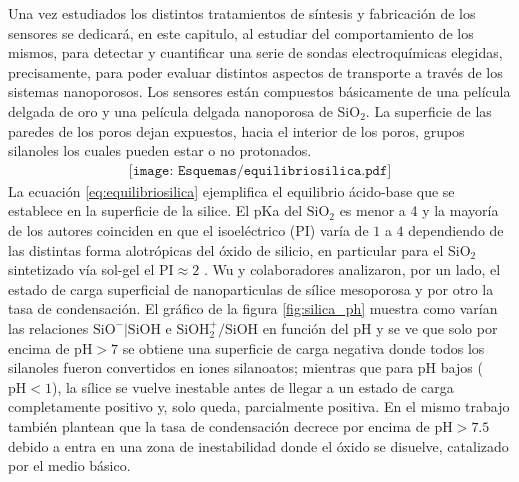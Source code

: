 	Una vez estudiados los distintos tratamientos de síntesis y fabricación de los sensores se dedicará, en este capitulo, al estudiar del comportamiento de los mismos, para detectar y cuantificar una serie de sondas electroquímicas elegidas, precisamente, para poder evaluar distintos aspectos de transporte a través de los sistemas nanoporosos. 
	Los sensores están compuestos básicamente de una película delgada de oro y una película delgada nanoporosa de SiO$_2$. La superficie de las paredes de los poros dejan expuestos, hacia el interior de los poros, grupos silanoles los cuales pueden estar o no protonados.\cite{Brinker1990,Soler-Illia2011} 
			\begin{equation}
				\begin{aligned}
				\texttt{[image: Esquemas/equilibriosilica.pdf]}
				\label{eq:equilibriosilica}
				\end{aligned}
				\end{equation}
	La ecuación \ref{eq:equilibriosilica} ejemplifica el equilibrio ácido-base que se establece en la superficie de la silice. El pKa del $\text{SiO}_2$ es menor a 4 y la mayoría de los autores coinciden en que el isoeléctrico (PI) varía de $1$ a $4$ dependiendo de  las distintas forma alotrópicas del óxido de silicio, en particular para el SiO$_2$ sintetizado vía sol-gel el $\text{PI}\approx 2$ \cite{Kosmulski2002,Kosmulski2014,Schwarz1984,Si-HanWu2013}.
	Wu y colaboradores\cite{Si-HanWu2013} analizaron, por un lado, el estado de carga superficial de nanoparticulas de sílice mesoporosa y por otro la tasa de condensación. El gráfico de la figura \ref{fig:silica_ph} muestra como varían las relaciones $\text{SiO}^{-}|\text{SiOH}$ e $\text{SiOH}_2^{+}/\text{SiOH}$ en función del pH y se ve que solo por encima de $\text{pH}>7$ se obtiene una superficie de carga negativa donde todos los silanoles fueron convertidos en iones silanoatos; mientras que para pH bajos ($\text{pH}<1$), la sílice se vuelve inestable antes de llegar a un estado de carga completamente positivo y, solo queda, parcialmente positiva. En el mismo trabajo\cite{Si-HanWu2013} también plantean que la tasa de condensación decrece por encima de $\text{pH}>7.5$ debido a entra en una zona de inestabilidad donde el óxido se disuelve, catalizado por el medio básico.
